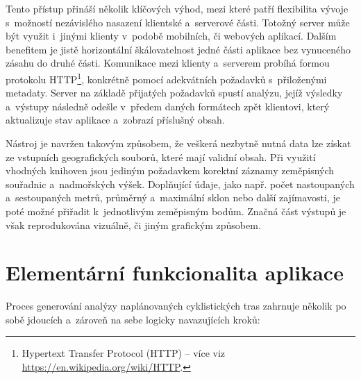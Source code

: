 Tento přístup přináší několik klíčových výhod, mezi které patří flexibilita vývoje s~možností nezávislého nasazení klientské a~serverové části.
Totožný server může být využit i~jinými klienty v~podobě mobilních, či webových aplikací.
Dalším benefitem je jistě horizontální škálovatelnost jedné části aplikace bez vynuceného zásahu do druhé části.
Komunikace mezi klienty a~serverem probíhá formou protokolu HTTP\footnote{Hypertext Transfer Protocol (HTTP) -- více viz \url{https://en.wikipedia.org/wiki/HTTP}.}, konkrétně pomocí adekvátních požadavků s~přiloženými metadaty.
Server na základě přijatých požadavků spustí analýzu, jejíž výsledky a~výstupy následně odešle v~předem daných formátech zpět klientovi, který aktualizuje stav aplikace a~zobrazí příslušný obsah.

Nástroj je navržen takovým způsobem, že veškerá nezbytně nutná data lze získat ze vstupních geografických souborů, které mají validní obsah.
Při využití vhodných knihoven jsou jediným požadavkem korektní záznamy zeměpisných souřadnic a~nadmořských výšek.
Doplňující údaje, jako např. počet nastoupaných a~sestoupaných metrů, průměrný a~maximální sklon nebo další zajímavosti, je poté možné přiřadit k~jednotlivým zeměpisným bodům.
Značná část výstupů je však reprodukována vizuálně, či jiným grafickým způsobem.

\section{Elementární funkcionalita aplikace}
\label{elementary-application-functionality}

Proces generování analýzy naplánovaných cyklistických tras zahrnuje několik po sobě jdoucích a~zároveň na sebe logicky navazujících kroků:

